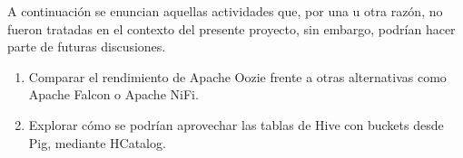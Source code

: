 A continuación se enuncian aquellas actividades que, por una u otra razón, no fueron tratadas en el contexto del presente proyecto, sin embargo, podrían hacer parte de futuras discusiones. \\

\begin{enumerate}

\item Comparar el rendimiento de Apache Oozie frente a otras alternativas como Apache Falcon o Apache NiFi.

\item Explorar cómo se podrían aprovechar las tablas de Hive con buckets desde Pig, mediante HCatalog.

\end{enumerate}